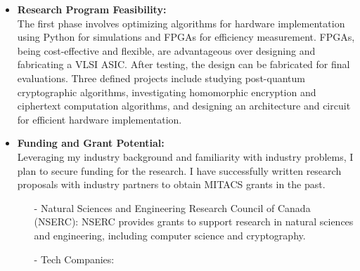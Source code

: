 \begin {itemize}
Regarding the Neural Networks, where I strategically utilized sparsity to achieve a significant reduction in the number of parameters by almost 80$\%$, without compromising accuracy. This reduction substantially lowered the computation required for inference tasks. The overarching goal is to apply these techniques to reduce computational requirements when performing inference on the encrypted data using HE.
 \item [$\bullet$] { \bf Research Program Feasibility:} \vspace{0.5em} \\
 The first phase involves optimizing algorithms for hardware implementation using Python for simulations and FPGAs for efficiency measurement. FPGAs, being cost-effective and flexible, are advantageous over designing and fabricating a VLSI ASIC. After testing, the design can be fabricated for final evaluations. Three defined projects include studying post-quantum cryptographic algorithms, investigating homomorphic encryption and ciphertext computation algorithms, and designing an architecture and circuit for efficient hardware implementation.
 \item [$\bullet$] { \bf Funding and Grant Potential:} \vspace{0.5em} \\
Leveraging my industry background and familiarity with industry problems, I plan to secure funding for the research. I have successfully written research proposals with industry partners to obtain MITACS grants in the past. 
       
\begin{itemize}
\item [-]
    Natural Sciences and Engineering Research Council of Canada (NSERC):
        NSERC provides grants to support research in natural sciences and engineering, including computer science and cryptography.

\item [-] Tech Companies:


\end{itemize}
\end{itemize}
